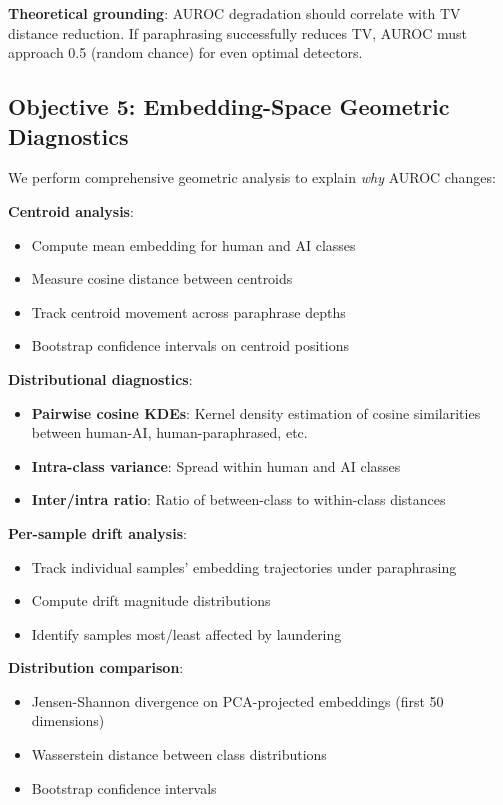 \documentclass[conference]{IEEEtran}
\begin{document}
\textbf{Theoretical grounding}: AUROC degradation should correlate with TV distance reduction. If paraphrasing successfully reduces TV, AUROC must approach 0.5 (random chance) for even optimal detectors.

\subsection{Objective 5: Embedding-Space Geometric Diagnostics}

We perform comprehensive geometric analysis to explain \emph{why} AUROC changes:

\textbf{Centroid analysis}:
\begin{itemize}
    \item Compute mean embedding for human and AI classes
    \item Measure cosine distance between centroids
    \item Track centroid movement across paraphrase depths
    \item Bootstrap confidence intervals on centroid positions
\end{itemize}

\textbf{Distributional diagnostics}:
\begin{itemize}
    \item \textbf{Pairwise cosine KDEs}: Kernel density estimation of cosine similarities between human-AI, human-paraphrased, etc.
    \item \textbf{Intra-class variance}: Spread within human and AI classes
    \item \textbf{Inter/intra ratio}: Ratio of between-class to within-class distances
\end{itemize}

\textbf{Per-sample drift analysis}:
\begin{itemize}
    \item Track individual samples' embedding trajectories under paraphrasing
    \item Compute drift magnitude distributions
    \item Identify samples most/least affected by laundering
\end{itemize}

\textbf{Distribution comparison}:
\begin{itemize}
    \item Jensen-Shannon divergence on PCA-projected embeddings (first 50 dimensions)
    \item Wasserstein distance between class distributions
    \item Bootstrap confidence intervals
\end{itemize}
\end{document}
